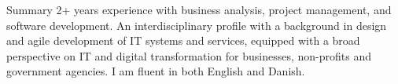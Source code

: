 \documentclass{resume}
\begin{document}

\begin{rSection}{Summary}
    {2+ years experience with business analysis, project management, and software development.}
    {An interdisciplinary profile with a background in design and agile development of IT systems and services, equipped with a broad perspective on IT and digital transformation for businesses, non-profits and government agencies.}
    {I am fluent in both English and Danish.}
\end{rSection}

\end{document}
